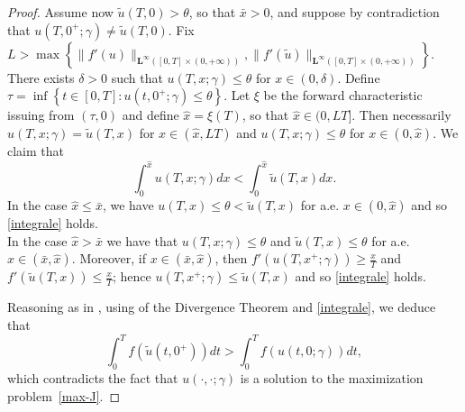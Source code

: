 \documentclass[a4paper, 10pt, final]{article}
\newcommand{\LL}[1]{\mathbf{L^{#1}}}
\begin{document}
\begin{proof}
  Assume now $\widetilde{u}(T, 0) > \theta$, so that $\bar x>0$, and suppose
  by contradiction that $u(T, 0^+; \gamma)\neq \widetilde u(T, 0)$.  
  Fix $L > \max \left\{\|f'(u)\|_{\LL\infty([0,T]\times (0, +\infty))}, 
  \|f'(\widetilde u)\|_{\LL\infty([0,T]\times (0,+\infty))}\right\}$.
  There exists $\delta>0$ such that $u(T, x; \gamma)\leq \theta $ for $x\in (0, \delta)$.
  Define $\tau=\inf\left\{t\in [0, T]: u(t, 0^+; \gamma)\leq \theta\right\}$. 
  Let $\xi$ be the forward characteristic issuing from $(\tau, 0)$ and 
  define $\hat x = \xi (T)$, so that $\hat x\in (0, LT]$.
  Then necessarily $u(T, x; \gamma) = \widetilde u(T,x)$ for $ x \in (\hat x, LT)$
  and $u(T, x; \gamma) \le \theta$ for $x \in (0, \hat x)$.  
  We claim that
  \begin{equation}
    \label{integrale}
    \int_0^{\hat x}  u(T,x; \gamma) dx < \int_0^{\hat x}  \widetilde u(T,x)dx.
  \end{equation} 
  In the case $\hat x \le \bar x$, we have $u(T,x)\leq \theta<\widetilde u(T,x)$ for a.e. $x \in (0, \hat x)$ 
  and so \eqref{integrale} holds.
  \\
  In the case $\hat x > \bar x$ we have that $u(T, x; \gamma) \le \theta$ and 
  $\widetilde{u}(T, x) \le \theta$ for a.e. $x \in (\bar x, \hat x)$.
  Moreover, if $x \in (\bar x, \hat x)$, then 
  $f'(u(T,x^+; \gamma )) \geq \frac{x}{T}$ and $f'(\widetilde u(T,x)) \leq \frac{x}{T}$;
  hence $u(T, x^+; \gamma) \le \widetilde{u}(T, x)$ and so \eqref{integrale} holds.


  Reasoning as in , using of the Divergence Theorem and \eqref{integrale}, we deduce that
  \begin{equation*}
    \int_0^T f(\widetilde{u}(t, 0^+)) dt > \int_0^T f(u(t, 0; \gamma)) dt,
  \end{equation*}
  which contradicts the fact that $u(\cdot, \cdot; \gamma)$ is a solution to the maximization problem~\eqref{max-J}.  
  \end{proof} 
\end{document}
